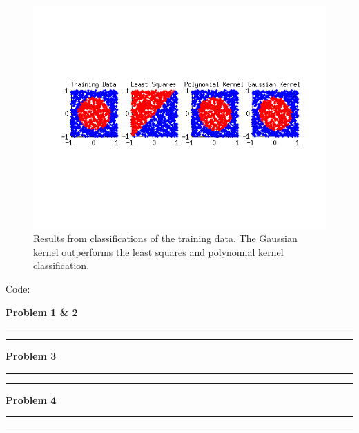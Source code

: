\documentclass{article}
\begin{document}
\begin{homeworkProblem}
\begin{figure}[!ht]
\begin{centering}
        \includegraphics[width=\linewidth]{fig_prob4.png}

        \caption{\label{fig:prob4} Results from classifications of the training
    data. The Gaussian kernel outperforms the least squares and polynomial
    kernel classification.} \end{centering}

    \end{figure} 

\end{homeworkProblem}

\clearpage
{\huge Code:}

{\large \bf Problem 1 \& 2} \\
 
\hrule \hrule

{\large \bf Problem 3} \\
 
\hrule \hrule

{\large \bf Problem 4} \\
 
\hrule \hrule
\end{document}
